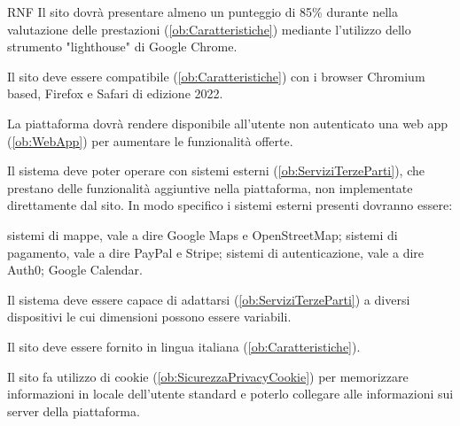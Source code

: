 \begin{listaPersonale}{RNF}
     Il sito dovrà presentare almeno un punteggio di 85\% durante nella valutazione delle prestazioni (\ref{ob:Caratteristiche}) mediante l'utilizzo dello strumento "lighthouse" di Google Chrome.

     Il sito deve essere compatibile (\ref{ob:Caratteristiche}) con i browser Chromium based, Firefox e Safari di edizione 2022.

     La piattaforma dovrà rendere disponibile all'utente non autenticato una web app (\ref{ob:WebApp}) per aumentare le funzionalità offerte.

     Il sistema deve poter operare con sistemi esterni (\ref{ob:ServiziTerzeParti}), che prestano delle funzionalità aggiuntive nella piattaforma, non implementate direttamente dal sito. In modo specifico i sistemi esterni presenti dovranno essere:
    \begin{listaPersonale2}[RNF]{}
         sistemi di mappe, vale a dire Google Maps e OpenStreetMap;
         sistemi di pagamento, vale a dire PayPal e Stripe;
         sistemi di autenticazione, vale a dire Auth0; %
         Google Calendar.
    \end{listaPersonale2}

     Il sistema deve essere capace di adattarsi (\ref{ob:ServiziTerzeParti}) a diversi dispositivi le cui dimensioni possono essere variabili.

     Il sito deve essere fornito in lingua italiana (\ref{ob:Caratteristiche}).

     Il sito fa utilizzo di cookie (\ref{ob:SicurezzaPrivacyCookie}) per memorizzare informazioni in locale dell'utente standard e poterlo collegare alle informazioni sui server della piattaforma.
\end{listaPersonale}